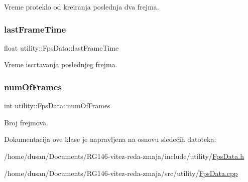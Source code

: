 Vreme proteklo od kreiranja poslednja dva frejma. 

\mbox{\label{classutility_1_1FpsData_a0340fb16b83e32835d5e8327b5b322e3}} 
\subsubsection{\texorpdfstring{last\+Frame\+Time}{lastFrameTime}}
{\footnotesize\ttfamily float utility\+::\+Fps\+Data\+::last\+Frame\+Time\hspace{0.3cm}{\ttfamily [private]}}



Vreme iscrtavanja poslednjeg frejma. 

\mbox{\label{classutility_1_1FpsData_acbf0bbe28e4d134e959970b252bc1bc1}} 
\subsubsection{\texorpdfstring{num\+Of\+Frames}{numOfFrames}}
{\footnotesize\ttfamily int utility\+::\+Fps\+Data\+::num\+Of\+Frames\hspace{0.3cm}{\ttfamily [private]}}



Broj frejmova. 



Dokumentacija ove klase je napravljena na osnovu sledećih datoteka\+:\begin{DoxyCompactItemize}
\item 
/home/dusan/\+Documents/\+R\+G146-\/vitez-\/reda-\/zmaja/include/utility/\hyperlink{FpsData_8h}{Fps\+Data.\+h}\item 
/home/dusan/\+Documents/\+R\+G146-\/vitez-\/reda-\/zmaja/src/utility/\hyperlink{FpsData_8cpp}{Fps\+Data.\+cpp}\end{DoxyCompactItemize}
